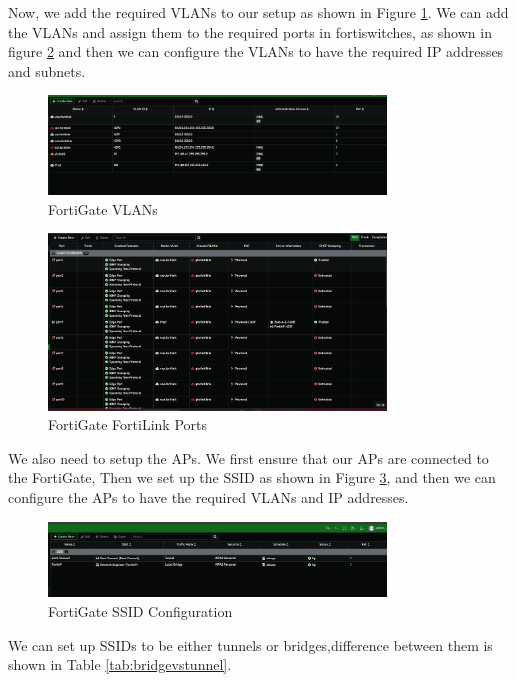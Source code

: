 \documentclass[12pt]{report}
\begin{document}
Now, we add the required VLANs to our setup as shown in Figure \ref{fig:flvlans}. We can add the VLANs and assign them to the required ports in fortiswitches, as shown in figure \ref{fig:flports2} and then we can configure the VLANs to have the required IP addresses and subnets.
\begin{figure}
    \centering
    \includegraphics[width=0.8\textwidth]{images/Implementation/flvlans.png}
    \caption{FortiGate VLANs}
    \label{fig:flvlans}
\end{figure}
\begin{figure}
    \centering
    \includegraphics[width=0.8\textwidth]{images/Implementation/flports2.png}
    \caption{FortiGate FortiLink Ports}
    \label{fig:flports2}
\end{figure}
We also need to setup the APs. 
We first ensure that our APs are connected to the FortiGate, Then we set up the SSID as shown in Figure \ref{fig:ssid}, and then we can configure the APs to have the required VLANs and IP addresses.
\begin{figure}
    \centering
    \includegraphics[width=0.8\textwidth]{images/Implementation/ssid.png}
    \caption{FortiGate SSID Configuration}
    \label{fig:ssid}
\end{figure}
We can set up SSIDs to be either 
tunnels or bridges,difference between them is shown in Table \ref{tab:bridgevstunnel}.
\end{document}
